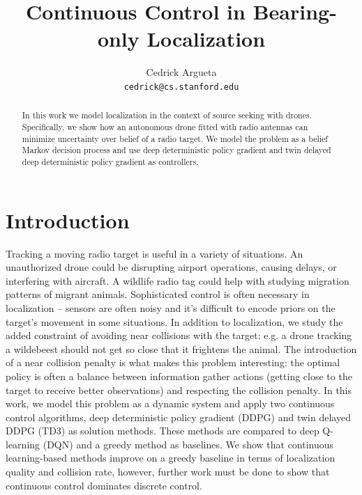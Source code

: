 \documentclass[10pt,twocolumn,letterpaper]{article}
\begin{document}
\title{Continuous Control in Bearing-only Localization}

\author{
  Cedrick Argueta \\
  \texttt{cedrick@cs.stanford.edu} \\
}

\maketitle

\begin{abstract}
In this work we model localization in the context of source seeking with drones.
Specifically, we show how an autonomous drone fitted with radio antennas can minimize uncertainty over belief of a radio target.
We model the problem as a belief Markov decision process and use deep deterministic policy gradient and twin delayed deep deterministic policy gradient as controllers.
\end{abstract}

\section{Introduction}
Tracking a moving radio target is useful in a variety of situations.
An unauthorized drone could be disrupting airport operations, causing delays, or interfering with aircraft.
A wildlife radio tag could help with studying migration patterns of migrant animals.
Sophisticated control is often necessary in localization -- sensors are often noisy and it's difficult to encode priors on the target's movement in some situations.
In addition to localization, we study the added constraint of avoiding near collisions with the target: e.g. a drone tracking a wildebeest should not get so close that it frightens the animal.
The introduction of a near collision penalty is what makes this problem interesting: the optimal policy is often a balance between information gather actions (getting close to the target to receive better observations) and respecting the collision penalty.
In this work, we model this problem as a dynamic system and apply two continuous control algorithms, deep deterministic policy gradient (DDPG) \cite{ddpg} and twin delayed DDPG (TD3) \cite{td3} as solution methods.
These methods are compared to deep Q-learning (DQN) \cite{dqn} and a greedy method as baselines.
We show that continuous learning-based methods improve on a greedy baseline in terms of localization quality and collision rate, however, further work must be done to show that continuous control dominates discrete control.
\end{document}
